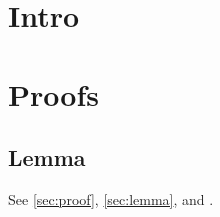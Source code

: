 \documentclass[twocolumn,unicode]{wrapper}
\begin{document}
\wrapperclass\articleclass\layoutmode\hypermode
\tableofcontents
\section{Intro}
\appendices
\section{Proofs}\label{sec:proof}
\subsection{Lemma}\label{sec:lemma}
See \autoref{sec:proof}, \autoref{sec:lemma}, and .
\end{document}
